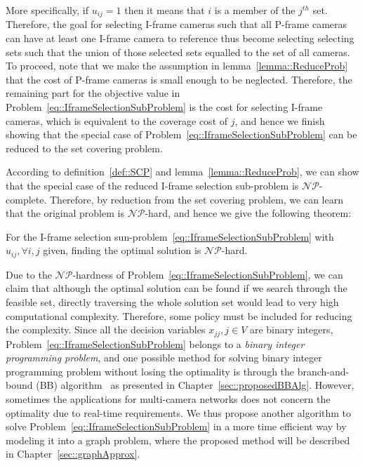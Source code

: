 More specifically, if $u_{ij} = 1$ then it means that $i$ is a member of the $j^{th}$ set.
Therefore, the goal for selecting I-frame cameras such that all P-frame cameras can have at least one I-frame camera to reference thus become selecting selecting sets such that the union of those selected sets equalled to the set of all cameras.
To proceed, note that we make the assumption in lemma~\ref{lemma::ReduceProb} that the cost of P-frame cameras is small enough to be neglected.
Therefore, the remaining part for the objective value in Problem~\eqref{eq::IframeSelectionSubProblem} is the cost for selecting I-frame cameras, which is equivalent to the coverage cost of $j$, and hence we finish showing that the special case of Problem~\eqref{eq::IframeSelectionSubProblem} can be reduced to the set covering problem.

According to definition~\ref{def::SCP} and lemma~\ref{lemma::ReduceProb}, we can show that the special case of the reduced I-frame selection sub-problem is $\mathcal{NP}$-complete.
Therefore, by reduction from the set covering problem, we can learn that the original problem is $\mathcal{NP}$-hard, and hence we give the following theorem:
\begin{mythm}
For the I-frame selection sun-problem~\eqref{eq::IframeSelectionSubProblem} with $u_{ij}, \forall i,j$ given, finding the optimal solution is $\mathcal{NP}$-hard.
\end{mythm}
Due to the $\mathcal{NP}$-hardness of Problem~\eqref{eq::IframeSelectionSubProblem}, we can claim that although the optimal solution can be found if we search through the feasible set, directly traversing the whole solution set would lead to very high computational complexity.
Therefore, some policy must be included for reducing the complexity.
Since all the decision variables ${x_{jj},j \in V}$ are binary integers, Problem~\eqref{eq::IframeSelectionSubProblem} belongs to a \emph{binary integer programming problem}, and one possible method for solving binary integer programming problem without losing the optimality is through the branch-and-bound (BB) algorithm~\cite{BB} as presented in Chapter~\ref{sec::proposedBBAlg}.
However, sometimes the applications for multi-camera networks does not concern the optimality due to real-time requirements.
We thus propose another algorithm to solve Problem~\eqref{eq::IframeSelectionSubProblem} in a more time efficient way by modeling it into a graph problem, where the proposed method will be described in Chapter~\ref{sec::graphApprox}.
%
